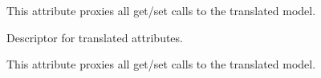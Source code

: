 \documentclass[letterpaper,10pt,french]{sphinxmanual}
\begin{document}
\begin{fulllineitems}
\begin{fulllineitems}
\sphinxAtStartPar
This attribute proxies all get/set calls to the translated model.

\end{fulllineitems}


\begin{fulllineitems}
\label{\detokenize{index:core.models.SwimmingPoolInfo.pool_opening_start}}
\pysigstartsignatures
\pysigline
{}
\pysigstopsignatures
\sphinxAtStartPar
Descriptor for translated attributes.

\sphinxAtStartPar
This attribute proxies all get/set calls to the translated model.

\end{fulllineitems}


\end{fulllineitems}

\end{document}
